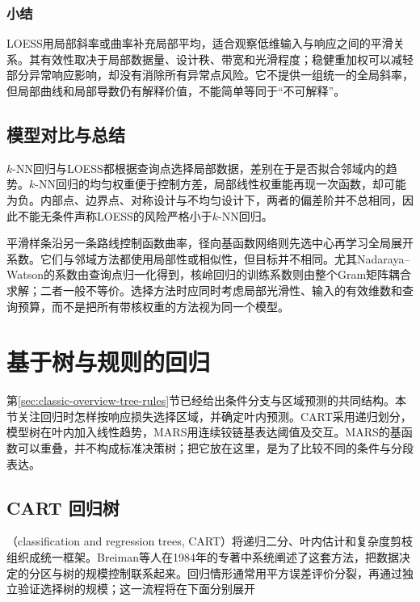 \subsubsection{小结}

LOESS用局部斜率或曲率补充局部平均，适合观察低维输入与响应之间的平滑关系。其有效性取决于局部数据量、设计秩、带宽和光滑程度；稳健重加权可以减轻部分异常响应影响，却没有消除所有异常点风险。它不提供一组统一的全局斜率，但局部曲线和局部导数仍有解释价值，不能简单等同于“不可解释”。

\subsection{模型对比与总结}

$k$-NN回归与LOESS都根据查询点选择局部数据，差别在于是否拟合邻域内的趋势。$k$-NN回归的均匀权重便于控制方差，局部线性权重能再现一次函数，却可能为负。内部点、边界点、对称设计与不均匀设计下，两者的偏差阶并不总相同，因此不能无条件声称LOESS的风险严格小于$k$-NN回归。

平滑样条沿另一条路线控制函数曲率，径向基函数网络则先选中心再学习全局展开系数。它们与邻域方法都使用局部性或相似性，但目标并不相同。尤其Nadaraya--Watson的系数由查询点归一化得到，核岭回归的训练系数则由整个Gram矩阵耦合求解；二者一般不等价。选择方法时应同时考虑局部光滑性、输入的有效维数和查询预算，而不是把所有带核权重的方法视为同一个模型。

\section{基于树与规则的回归}
\label{sec:regression-trees}

第\ref{sec:classic-overview-tree-rules}节已经给出条件分支与区域预测的共同结构。本节关注回归时怎样按响应损失选择区域，并确定叶内预测。CART采用递归划分，模型树在叶内加入线性趋势，MARS用连续铰链基表达阈值及交互。MARS的基函数可以重叠，并不构成标准决策树；把它放在这里，是为了比较不同的条件与分段表达。

\subsection{CART 回归树}
\label{sec:regression-cart}

（classification and regression trees, CART）将递归二分、叶内估计和复杂度剪枝组织成统一框架。Breiman等人在1984年的专著中系统阐述了这套方法，把数据决定的分区与树的规模控制联系起来。回归情形通常用平方误差评价分裂，再通过独立验证选择树的规模；这一流程将在下面分别展开

